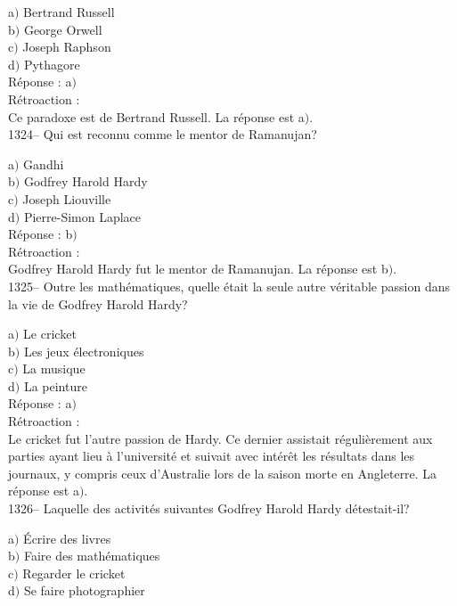 ﻿\documentclass[letterpaper, 12pt]{article}
\begin{document}
a$)$ Bertrand Russell \\
b$)$ George Orwell \\
c$)$ Joseph Raphson \\
d$)$ Pythagore\\

R\'eponse : a$)$\\

R\'etroaction : \\
Ce paradoxe est de Bertrand Russell.
La r\'eponse est  a$)$.\\

1324-- Qui est reconnu comme le mentor de Ramanujan?

a$)$ Gandhi \\
b$)$ Godfrey Harold Hardy \\
c$)$ Joseph Liouville \\
d$)$ Pierre-Simon Laplace \\

R\'eponse : b$)$\\

R\'etroaction : \\
Godfrey Harold Hardy fut le mentor de Ramanujan.
La r\'eponse est  b$)$.\\

1325-- Outre les math\'ematiques, quelle \'etait la seule autre
v\'eritable passion dans la vie de Godfrey Harold Hardy?

a$)$ Le cricket \\
b$)$ Les jeux \'electroniques \\
c$)$ La musique \\
d$)$ La peinture \\

R\'eponse : a$)$\\

R\'etroaction : \\
Le cricket fut l'autre passion de Hardy. Ce dernier assistait
r\'eguli\`erement aux parties ayant lieu \`a l'universit\'e et
suivait avec int\'er\^et les r\'esultats dans les journaux, y
compris ceux d'Australie lors de la saison morte en Angleterre.
La r\'eponse est  a$)$.\\

1326-- Laquelle des activit\'es suivantes Godfrey Harold Hardy
d\'etestait-il?

a$)$ \'Ecrire des livres \\
b$)$ Faire des math\'ematiques \\
c$)$ Regarder le cricket \\
d$)$ Se faire photographier\\
\end{document}

